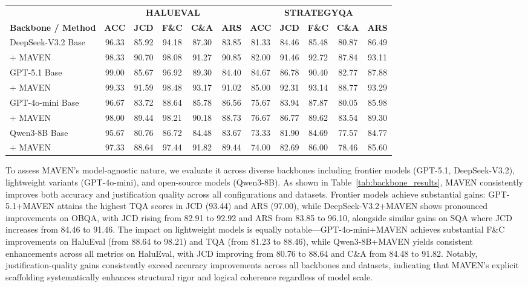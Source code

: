 \documentclass{article}
\begin{document}
\begin{table}[t]
\begin{tabular}{l ccccc ccccc}
\toprule
& \multicolumn{5}{c}{\textbf{HALUEVAL}} & \multicolumn{5}{c}{\textbf{STRATEGYQA}} \\
\cmidrule(lr){2-6} \cmidrule(lr){7-11}
\textbf{Backbone / Method} & \textbf{ACC} & \textbf{JCD} & \textbf{F\&C} & \textbf{C\&A} & \textbf{ARS} & \textbf{ACC} & \textbf{JCD} & \textbf{F\&C} & \textbf{C\&A} & \textbf{ARS} \\
\midrule
DeepSeek-V3.2 Base         & 96.33 & 85.92 & 94.18 & 87.30 & 83.85 & 81.33 & 84.46 & 85.48 & 80.87 & 86.49 \\
\quad $+$ MAVEN       & 98.33 & 90.70 & 98.08 & 91.27 & 90.85 & 82.00 & 91.46 & 92.72 & 87.84 & 93.11 \\
GPT-5.1 Base          & 99.00 & 85.67 & 96.92 & 89.30 & 84.40 & 84.67 & 86.78 & 90.40 & 82.77 & 87.88 \\
\quad $+$ MAVEN       & 99.33 & 91.59 & 98.48 & 93.17 & 91.02 & 85.00 & 92.31 & 93.14 & 88.77 & 93.29 \\
\midrule
GPT-4o-mini Base      & 96.67 & 83.72 & 88.64 & 85.78 & 86.56 & 75.67 & 83.94 & 87.87 & 80.05 & 85.98 \\
\quad $+$ MAVEN       & 98.00 & 89.44 & 98.21 & 90.18 & 88.73 & 76.67 & 86.77 & 89.62 & 83.54 & 89.30 \\
Qwen3-8B Base         & 95.67 & 80.76 & 86.72 & 84.48 & 83.67 & 73.33 & 81.90 & 84.69 & 77.57 & 84.77 \\
\quad $+$ MAVEN       & 97.33 & 88.64 & 97.44 & 91.82 & 89.44 & 74.00 & 82.69 & 86.00 & 78.46 & 85.60 \\
\bottomrule
\end{tabular}
\end{table}

To assess MAVEN's model-agnostic nature, we evaluate it across diverse backbones including frontier models (GPT-5.1, DeepSeek-V3.2), lightweight variants (GPT-4o-mini), and open-source models (Qwen3-8B). As shown in Table~\ref{tab:backbone_results}, MAVEN consistently improves both accuracy and justification quality across all configurations and datasets. Frontier models achieve substantial gains: GPT-5.1+MAVEN attains the highest TQA scores in JCD (93.44) and ARS (97.00), while DeepSeek-V3.2+MAVEN shows pronounced improvements on OBQA, with JCD rising from 82.91 to 92.92 and ARS from 83.85 to 96.10, alongside similar gains on SQA where JCD increases from 84.46 to 91.46. The impact on lightweight models is equally notable—GPT-4o-mini+MAVEN achieves substantial F\&C improvements on HaluEval (from 88.64 to 98.21) and TQA (from 81.23 to 88.46), while Qwen3-8B+MAVEN yields consistent enhancements across all metrics on HaluEval, with JCD improving from 80.76 to 88.64 and C\&A from 84.48 to 91.82. Notably, justification-quality gains consistently exceed accuracy improvements across all backbones and datasets, indicating that MAVEN's explicit scaffolding systematically enhances structural rigor and logical coherence regardless of model scale.
\end{document}
